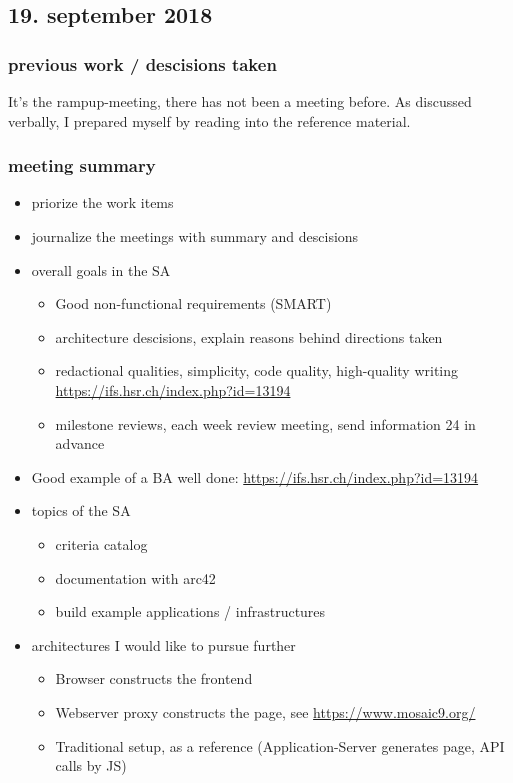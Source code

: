 \documentclass{article}
\begin{document}
\subsection{19. september 2018}

\subsubsection{previous work / descisions taken}
It's the rampup-meeting, there has not been a meeting before. As discussed verbally, I prepared myself by reading into the reference material.

\subsubsection{meeting summary}

\begin{itemize}
    \item priorize the work items
    \item journalize the meetings with summary and descisions
    \item overall goals in the SA
        \begin{itemize}
            \item Good non-functional requirements (SMART)
            \item architecture descisions, explain reasons behind directions taken
            \item redactional qualities, simplicity, code quality, high-quality writing \url{https://ifs.hsr.ch/index.php?id=13194}
            \item milestone reviews, each week review meeting, send information 24 in advance 
        \end{itemize}
    \item Good example of a BA well done: \url{https://ifs.hsr.ch/index.php?id=13194}
    \item topics of the SA
        \begin{itemize}
            \item criteria catalog
            \item documentation with arc42
            \item build example applications / infrastructures 
        \end{itemize}
    \item architectures I would like to pursue further
        \begin{itemize}
            \item Browser constructs the frontend
            \item Webserver proxy constructs the page, see \url{https://www.mosaic9.org/}
            \item Traditional setup, as a reference (Application-Server generates page, API calls by JS)
        \end{itemize}
\end{itemize}
\end{document}
